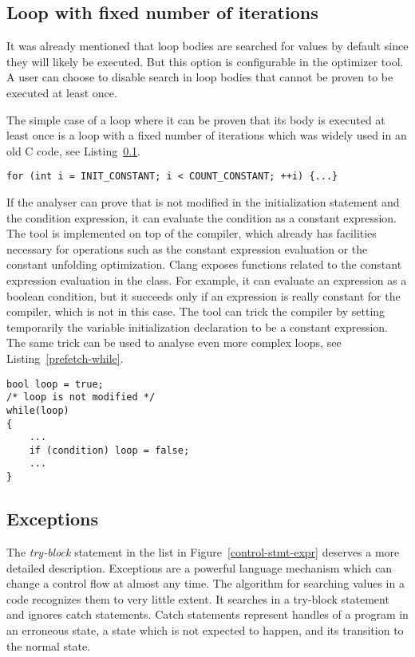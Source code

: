 \subsection{Loop with fixed number of iterations}
\label{prefetch-for}
It was already mentioned that loop bodies are searched for values by default since they will likely be executed. But this option is configurable in the optimizer tool. A user can choose to disable search in loop bodies that cannot be proven to be executed at least once.

The simple case of a loop where it can be proven that its body is executed at least once is a  loop with a fixed number of iterations which was widely used in an old C code, see Listing~\ref{prefetch-for}.

\begin{lstlisting}[caption={A \code{for} loop with a constant number of iterations.}, label={prefetch-for}]
for (int i = INIT_CONSTANT; i < COUNT_CONSTANT; ++i) {...}
\end{lstlisting}

If the analyser can prove that  is not modified in the initialization statement and the condition expression, it can evaluate the condition as a constant expression. The tool is implemented on top of the compiler, which already has facilities necessary for operations such as the constant expression evaluation or the constant unfolding optimization. Clang exposes functions related to the constant expression evaluation in the  class. For example, it can evaluate an expression as a boolean condition, but it succeeds only if an expression is really constant for the compiler, which is not in this case. The tool can trick the compiler by setting temporarily the variable initialization declaration to be a constant expression. The same trick can be used to analyse even more complex loops, see Listing~\ref{prefetch-while}.

\begin{lstlisting}[caption={Another example of a loop with at least one body execution.}, label={prefetch-while}, float=htpb, captionpos=b]
bool loop = true;
/* loop is not modified */
while(loop)
{
    ...
    if (condition) loop = false;
    ...
}
\end{lstlisting}

\subsection{Exceptions}
The \emph{try-block} statement in the list in Figure~\ref{control-stmt-expr} deserves a more detailed description. Exceptions are a powerful language mechanism which can change a control flow at almost any time. The algorithm for searching values in a code recognizes them to very little extent. It searches in a try-block statement and ignores catch statements. Catch statements represent handles of a program in an erroneous state, a state which is not expected to happen, and its transition to the normal state.

